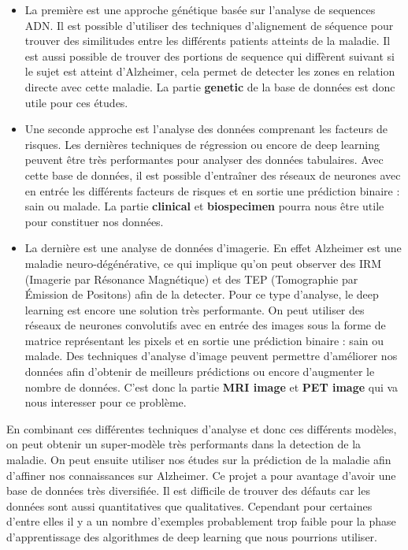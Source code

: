 \documentclass[
	12pt, %
]{fphw}
\begin{document}
\begin{itemize}
\item La première est une approche génétique basée sur l'analyse de sequences ADN. Il est possible d'utiliser des techniques d'alignement de séquence pour trouver des similitudes entre les différents patients atteints de la maladie. Il est aussi possible de trouver des portions de sequence qui diffèrent suivant si le sujet est atteint d'Alzheimer, cela permet de detecter les zones en relation directe avec cette maladie. La partie \textbf{genetic} de la base de données est donc utile pour ces études.
\item Une seconde approche est l'analyse des données comprenant les facteurs de risques. Les dernières techniques de régression ou encore de deep learning peuvent être très performantes pour analyser des données tabulaires. Avec cette base de données, il est possible d'entraîner des réseaux de neurones avec en entrée les différents facteurs de risques et en sortie une prédiction binaire : sain ou malade. La partie \textbf{clinical} et \textbf{biospecimen} pourra nous être utile pour constituer nos données.
\item La dernière est une analyse de données d'imagerie. En effet Alzheimer est une maladie neuro-dégénérative, ce qui implique qu'on peut observer des IRM (Imagerie par Résonance Magnétique) et des TEP (Tomographie par Émission de Positons) afin de la detecter. Pour ce type d'analyse, le deep learning est encore une solution très performante. On peut utiliser des réseaux de neurones convolutifs avec en entrée des images sous la forme de matrice représentant les pixels et en sortie une prédiction binaire : sain ou malade. Des techniques d'analyse d'image peuvent permettre d'améliorer nos données afin d'obtenir de meilleurs prédictions ou encore d'augmenter le nombre de données. C'est donc la partie \textbf{MRI image} et \textbf{PET image} qui va nous interesser pour ce problème.
\end{itemize}

En combinant ces différentes techniques d'analyse et donc ces différents modèles, on peut obtenir un super-modèle très performants dans la detection de la maladie. On peut ensuite utiliser nos études sur la prédiction de la maladie afin d'affiner nos connaissances sur Alzheimer. Ce projet a pour avantage d'avoir une base de données très diversifiée. Il est difficile de trouver des défauts car les données sont aussi quantitatives que qualitatives. Cependant pour certaines d'entre elles il y a un nombre d'exemples probablement trop faible pour la phase d'apprentissage des algorithmes de deep learning que nous pourrions utiliser.

\end{document}
